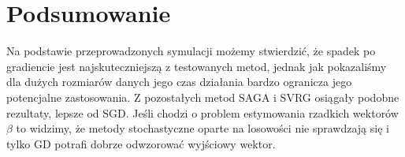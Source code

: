 \documentclass[a4paper]{article}
\begin{document}
\section{Podsumowanie}
Na podstawie przeprowadzonych symulacji możemy stwierdzić, że spadek po gradiencie jest najskuteczniejszą z testowanych metod, jednak jak pokazaliśmy dla dużych rozmiarów danych jego czas działania bardzo ogranicza jego potencjalne zastosowania. Z pozostałych metod SAGA i SVRG osiągały podobne rezultaty, lepsze od SGD. Jeśli chodzi o problem estymowania rzadkich wektorów $\beta$ to widzimy, że metody stochastyczne oparte na losowości nie sprawdzają się i tylko GD potrafi dobrze odwzorować wyjściowy wektor.




\end{document}
